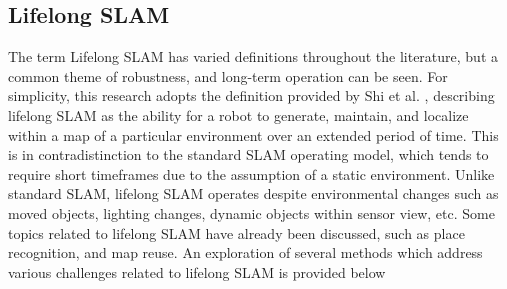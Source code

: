 \subsection{Lifelong SLAM}

The term Lifelong SLAM has varied definitions throughout the literature, but a common theme of robustness, and long-term operation can be seen. For simplicity, this research adopts the definition provided by Shi et al. \cite{shiAreWeReady2020}, describing lifelong SLAM as the ability for a robot to generate, maintain, and localize within a map of a particular environment over an extended period of time. This is in contradistinction to the standard SLAM operating model, which tends to require short timeframes due to the assumption of a static environment. Unlike standard SLAM, lifelong SLAM operates despite environmental changes such as moved objects, lighting changes, dynamic objects within sensor view, etc. Some topics related to lifelong SLAM have already been discussed, such as place recognition, and map reuse. An exploration of several methods which address various challenges related to lifelong SLAM is provided below